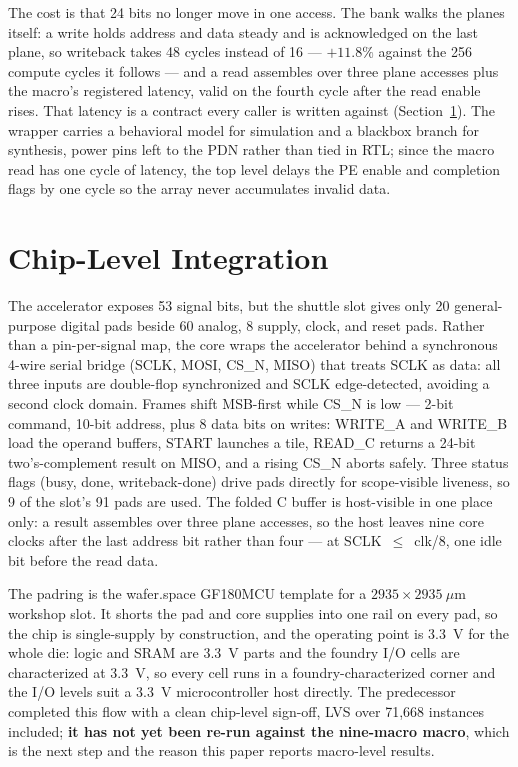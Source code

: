 \documentclass[conference,a4paper]{APSIPA2026}
\begin{document}
The cost is that 24 bits no longer move in one access. The bank walks the planes itself: a write holds address and data steady and is acknowledged on the last plane, so writeback takes 48 cycles instead of 16 --- $+11.8\%$ against the 256 compute cycles it follows --- and a read assembles over three plane accesses plus the macro's registered latency, valid on the fourth cycle after the read enable rises. That latency is a contract every caller is written against (Section~\ref{sec:chip}). The wrapper carries a behavioral model for simulation and a blackbox branch for synthesis, power pins left to the PDN rather than tied in RTL; since the macro read has one cycle of latency, the top level delays the PE enable and completion flags by one cycle so the array never accumulates invalid data.

\section{Chip-Level Integration}\label{sec:chip}

The accelerator exposes 53 signal bits, but the shuttle slot gives only 20 general-purpose digital pads beside 60 analog, 8 supply, clock, and reset pads. Rather than a pin-per-signal map, the core wraps the accelerator behind a synchronous 4-wire serial bridge (SCLK, MOSI, CS\_N, MISO) that treats SCLK as data: all three inputs are double-flop synchronized and SCLK edge-detected, avoiding a second clock domain. Frames shift MSB-first while CS\_N is low --- 2-bit command, 10-bit address, plus 8 data bits on writes: WRITE\_A and WRITE\_B load the operand buffers, START launches a tile, READ\_C returns a 24-bit two's-complement result on MISO, and a rising CS\_N aborts safely. Three status flags (busy, done, writeback-done) drive pads directly for scope-visible liveness, so 9 of the slot's 91 pads are used. The folded C buffer is host-visible in one place only: a result assembles over three plane accesses, so the host leaves nine core clocks after the last address bit rather than four --- at SCLK~$\leq$~clk/8, one idle bit before the read data.

The padring is the wafer.space GF180MCU template \cite{padring} for a $2935\times2935~\mu$m workshop slot. It shorts the pad and core supplies into one rail on every pad, so the chip is single-supply by construction, and the operating point is 3.3~V for the whole die: logic and SRAM are 3.3~V parts and the foundry I/O cells are characterized at 3.3~V, so every cell runs in a foundry-characterized corner and the I/O levels suit a 3.3~V microcontroller host directly. The predecessor completed this flow with a clean chip-level sign-off, LVS over 71{,}668 instances included; \textbf{it has not yet been re-run against the nine-macro macro}, which is the next step and the reason this paper reports macro-level results.
\end{document}
